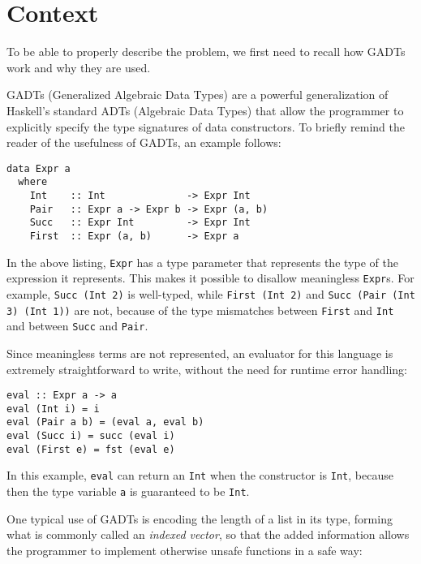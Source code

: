 \section{Context}
\label{sec:context}

To be able to properly describe the problem, we first need to recall how GADTs work and why they are used.

GADTs (Generalized Algebraic Data Types) are a powerful generalization of Haskell's standard ADTs (Algebraic Data Types) that allow the programmer to explicitly specify the type signatures of data constructors\cite{simple-unification-based-type-inference-for-gadts}. To briefly remind the reader of the usefulness of GADTs, an example follows:

\begin{lstlisting}[caption=A GADT describing a simple language with ints and pairs]
data Expr a
  where
    Int    :: Int              -> Expr Int
    Pair   :: Expr a -> Expr b -> Expr (a, b)
    Succ   :: Expr Int         -> Expr Int
    First  :: Expr (a, b)      -> Expr a
\end{lstlisting}

In the above listing, \texttt{Expr} has a type parameter that represents the type of the expression it represents.
This makes it possible to disallow meaningless \texttt{Expr}s.
For example, \texttt{Succ (Int 2)} is well-typed, while \texttt{First (Int 2)} and \texttt{Succ (Pair (Int 3) (Int 1))} are not, because of the type mismatches between \texttt{First} and \texttt{Int} and between \texttt{Succ} and \texttt{Pair}.

Since meaningless terms are not represented, an evaluator for this language is extremely straightforward to write, without the need for runtime error handling:

\begin{lstlisting}[caption=Evaluator for \texttt{Expr}]
eval :: Expr a -> a
eval (Int i) = i
eval (Pair a b) = (eval a, eval b)
eval (Succ i) = succ (eval i)
eval (First e) = fst (eval e)
\end{lstlisting}

In this example, \texttt{eval} can return an \texttt{Int} when the constructor is \texttt{Int}, because then the type variable \texttt{a} is guaranteed to be \texttt{Int}.

One typical use of GADTs is encoding the length of a list in its type, forming what is commonly called an \emph{indexed vector}, so that the added information allows the programmer to implement otherwise unsafe functions in a safe way:

